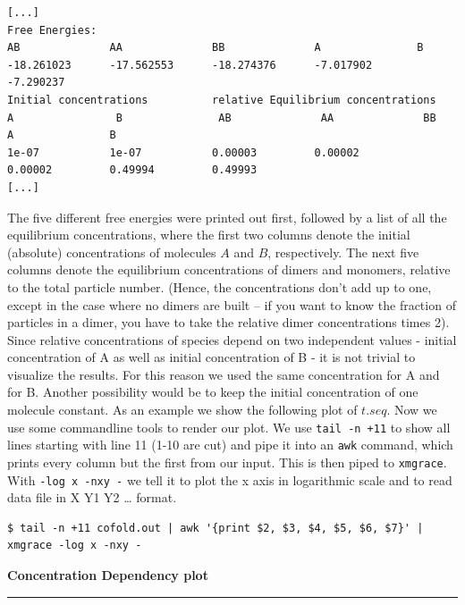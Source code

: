 \documentclass[]{article}
\begin{document}
\begin{verbatim}
[...]
Free Energies:
AB              AA              BB              A               B
-18.261023      -17.562553      -18.274376      -7.017902       -7.290237
Initial concentrations          relative Equilibrium concentrations
A                B               AB              AA              BB              A               B
1e-07           1e-07           0.00003         0.00002         0.00002         0.49994         0.49993
[...]
\end{verbatim}

The five different free energies were printed out first, followed by a list
of all the equilibrium concentrations, where the first two columns denote
the initial (absolute) concentrations of molecules \(A\) and \(B\),
respectively. The next five columns denote the equilibrium concentrations
of dimers and monomers, relative to the total particle number. (Hence,
the concentrations don't add up to one, except in the case where no
dimers are built -- if you want to know the fraction of particles in a
dimer, you have to take the relative dimer concentrations times 2).\\
Since relative concentrations of species depend on two independent
values - initial concentration of A as well as initial concentration of
B - it is not trivial to visualize the results. For this reason we used
the same concentration for A and for B. Another possibility would be to
keep the initial concentration of one molecule constant. As an example
we show the following plot of \(t.seq\). Now we use some commandline
tools to render our plot. We use \texttt{tail\ -n\ +11} to show all
lines starting with line 11 (1-10 are cut) and pipe it into an
\texttt{awk} command, which prints every column but the first from our
input. This is then piped to \texttt{xmgrace}. With
\texttt{-log\ x\ -nxy\ -} we tell it to plot the x axis in logarithmic
scale and to read data file in X Y1 Y2 \ldots{} format.

\begin{verbatim}
$ tail -n +11 cofold.out | awk '{print $2, $3, $4, $5, $6, $7}' | xmgrace -log x -nxy -
\end{verbatim}

\textbf{Concentration Dependency plot}\\

\begin{center}\rule{0.5\linewidth}{\linethickness}\end{center}
\end{document}

